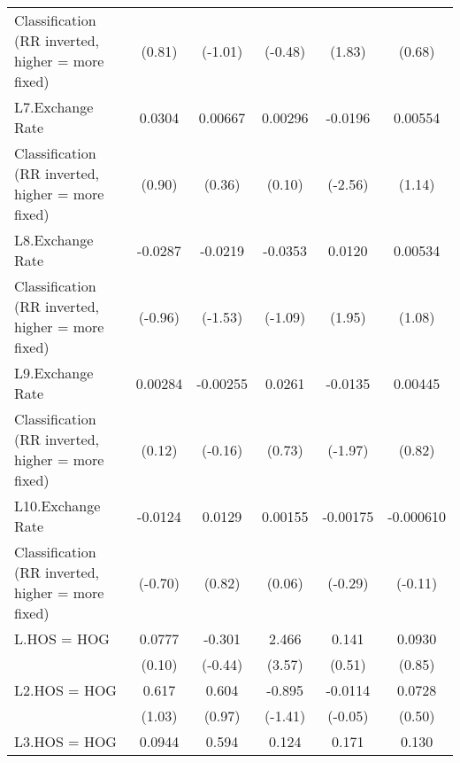 {\begin{tabular}{l*{5}{c}}
Classification (RR inverted, higher = more fixed)&      (0.81)         &     (-1.01)         &     (-0.48)         &      (1.83)         &      (0.68)         \\
[1em]
L7.Exchange Rate    &      0.0304         &     0.00667         &     0.00296         &     -0.0196\sym{*}  &     0.00554         \\
Classification (RR inverted, higher = more fixed)&      (0.90)         &      (0.36)         &      (0.10)         &     (-2.56)         &      (1.14)         \\
[1em]
L8.Exchange Rate    &     -0.0287         &     -0.0219         &     -0.0353         &      0.0120         &     0.00534         \\
Classification (RR inverted, higher = more fixed)&     (-0.96)         &     (-1.53)         &     (-1.09)         &      (1.95)         &      (1.08)         \\
[1em]
L9.Exchange Rate    &     0.00284         &    -0.00255         &      0.0261         &     -0.0135         &     0.00445         \\
Classification (RR inverted, higher = more fixed)&      (0.12)         &     (-0.16)         &      (0.73)         &     (-1.97)         &      (0.82)         \\
[1em]
L10.Exchange Rate   &     -0.0124         &      0.0129         &     0.00155         &    -0.00175         &   -0.000610         \\
Classification (RR inverted, higher = more fixed)&     (-0.70)         &      (0.82)         &      (0.06)         &     (-0.29)         &     (-0.11)         \\
[1em]
L.HOS = HOG         &      0.0777         &      -0.301         &       2.466\sym{***}&       0.141         &      0.0930         \\
                    &      (0.10)         &     (-0.44)         &      (3.57)         &      (0.51)         &      (0.85)         \\
[1em]
L2.HOS = HOG        &       0.617         &       0.604         &      -0.895         &     -0.0114         &      0.0728         \\
                    &      (1.03)         &      (0.97)         &     (-1.41)         &     (-0.05)         &      (0.50)         \\
[1em]
L3.HOS = HOG        &      0.0944         &       0.594         &       0.124         &       0.171         &       0.130         \\

\end{tabular}}
